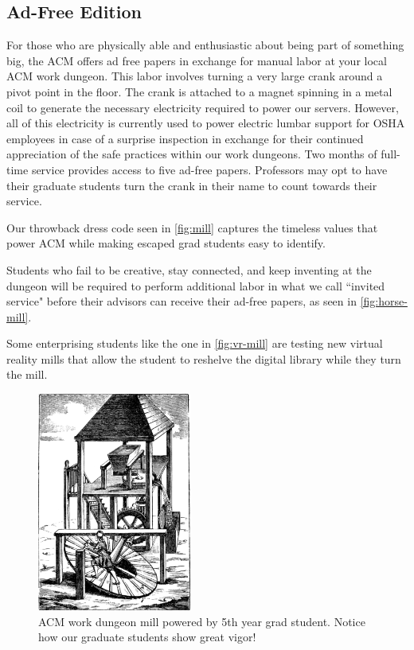 \subsection{Ad-Free Edition}
For those who are physically able and enthusiastic about being part of
something big, the ACM offers ad free papers in exchange for manual labor at
your local ACM work dungeon.
This labor involves turning a very large crank around a pivot point in the
floor.
The crank is attached to a magnet spinning in a metal coil to generate the
necessary electricity required to power our servers.
However, all of this electricity is currently used to power electric lumbar
support for OSHA employees in case of a surprise inspection in exchange for
their continued appreciation of the safe practices within our work dungeons.
Two months of full-time service provides access to five ad-free papers.
Professors may opt to have their graduate students turn the crank in their name
to count towards their service.

Our throwback dress code seen in \autoref{fig:mill} captures the timeless
values that power ACM while making escaped grad students easy to identify.

Students who fail to be creative, stay connected, and keep inventing at the
dungeon will be required to perform additional labor in what we call ``invited
service" before their advisors can receive their ad-free papers, as seen in
\autoref{fig:horse-mill}.

Some enterprising students like the one in \autoref{fig:vr-mill} are testing
new virtual reality mills that allow the student to reshelve the digital
library while they turn the mill.

\begin{figure}
  \centering
  \includegraphics[width=0.45\textwidth]{figures/mill.png}
  \caption{ACM work dungeon mill powered by 5th year grad student. Notice how
  our graduate students show great vigor!}
  \label{fig:mill}
\end{figure}

